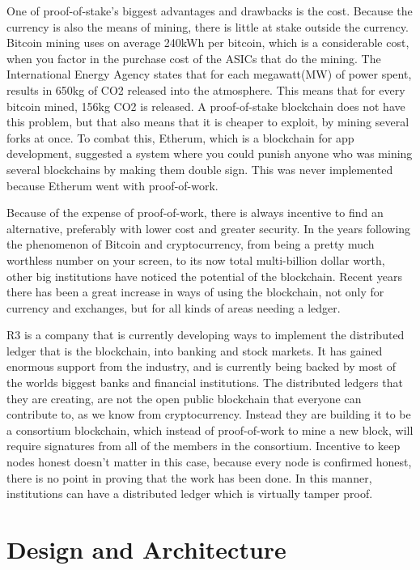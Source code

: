 \documentclass[11pt]{article}
\begin{document}
One of proof-of-stake's biggest advantages and drawbacks is the cost. Because the currency is also the means of mining, there is little at stake outside the currency. Bitcoin mining uses on average 240kWh per bitcoin, which is a considerable cost, when you factor in the purchase cost of the ASICs that do the mining. The International Energy Agency states that for each megawatt(MW) of power spent, results in 650kg of CO2 released into the atmosphere. This means that for every bitcoin mined, 156kg CO2 is released. A proof-of-stake blockchain does not have this problem, but that also means that it is cheaper to exploit, by mining several forks at once. To combat this, Etherum, which is a blockchain for app development, suggested a system where you could punish anyone who was mining several blockchains by making them double sign. This was never implemented because Etherum went with proof-of-work. 

Because of the expense of proof-of-work, there is always incentive to find an alternative, preferably with lower cost and greater security. In the years following the phenomenon of Bitcoin and cryptocurrency, from being a pretty much worthless number on your screen, to its now total multi-billion dollar worth, other big institutions have noticed the potential of the blockchain. Recent years there has been a great increase in ways of using the blockchain, not only for currency and exchanges, but for all kinds of areas needing a ledger.

 R3 is a company that is currently developing ways to implement the distributed ledger that is the blockchain, into banking and stock markets. It has gained enormous support from the industry, and is currently being backed by most of the worlds biggest banks and financial institutions. The distributed ledgers that they are creating, are not the open public blockchain that everyone can contribute to, as we know from cryptocurrency. Instead they are building it to be a consortium blockchain, which instead of proof-of-work to mine a new block, will require signatures from all of the members in the consortium. Incentive to keep nodes honest doesn't matter in this case, because every node is confirmed honest, there is no point in proving that the work has been done. In this manner, institutions can have a distributed ledger which is virtually tamper proof. 


\section{Design and Architecture}
\end{document}
